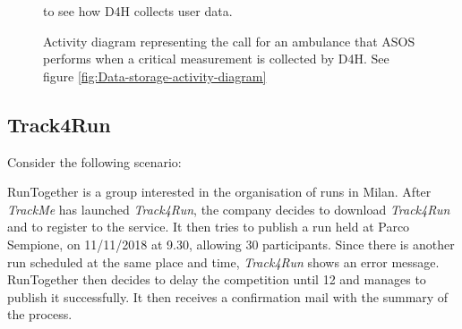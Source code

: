             \begin{figure}[H]
                \centering
                \caption{Activity diagram representing the call for an ambulance that ASOS performs when a critical measurement is collected by D4H. See figure \ref{fig:Data-storage-activity-diagram}} to see how D4H collects user data.
                \label{fig:ASOS-activity-diagram1}
            \end{figure}
            
    \subsection{Track4Run}
        Consider the following scenario:
        
        RunTogether is a group interested in the organisation of runs in Milan. After \emph{TrackMe} has launched \emph{Track4Run}, the company decides to download \emph{Track4Run} and to register to the service. It then tries to publish a run held at Parco Sempione, on 11/11/2018 at 9.30, allowing 30 participants. Since there is another run scheduled at the same place and time, \emph{Track4Run} shows an error message. RunTogether then decides to delay the competition until 12 and manages to publish it successfully. It then receives a confirmation mail with the summary of the process.
        
